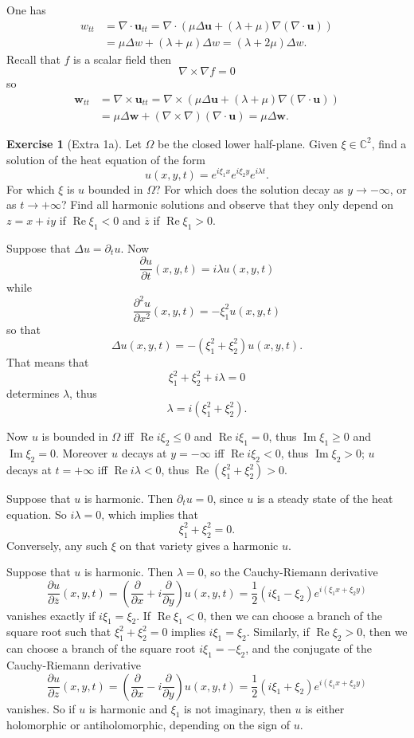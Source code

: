 \documentclass[10pt]{article}
\newcommand{\CC}{\mathbb{C}}
\renewcommand{\Re}{\operatorname{Re}}
\renewcommand{\Im}{\operatorname{Im}}
\theoremstyle{definition}
\newtheorem{exer}{Exercise}
\begin{document}
One has
\begin{align*}
w_{tt} &= \nabla \cdot \mathbf u_{tt} = \nabla \cdot(\mu \Delta \mathbf u + (\lambda + \mu)\nabla(\nabla \cdot \mathbf u) )\\
&= \mu\Delta w + (\lambda + \mu)\Delta w = (\lambda + 2\mu)\Delta w.
\end{align*}
Recall that $f$ is a scalar field then
$$\nabla \times \nabla f = 0$$
so
\begin{align*}
\mathbf w_{tt} &= \nabla \times \mathbf u_{tt} = \nabla \times (\mu\Delta \mathbf u + (\lambda + \mu)\nabla(\nabla \cdot \mathbf u))\\
&= \mu \Delta \mathbf w + (\nabla \times \nabla)(\nabla \cdot \mathbf u) = \mu \Delta \mathbf w.
\end{align*}

\begin{exer}[Extra 1a]
Let $\Omega$ be the closed lower half-plane. Given $\xi \in \CC^2$, find a solution of the heat equation of the form
$$u(x, y, t) = e^{i\xi_1x}e^{i\xi_2y}e^{i\lambda t}.$$
For which $\xi$ is $u$ bounded in $\Omega$? For which does the solution decay as $y \to -\infty$, or as $t \to +\infty$?
Find all harmonic solutions and observe that they only depend on $z = x + iy$ if $\Re \xi_1 < 0$ and $\overline z $ if $\Re \xi_1 > 0$.
\end{exer}

Suppose that $\Delta u = \partial_t u$. Now
$$\frac{\partial u}{\partial t} (x, y, t) = i\lambda u(x, y, t)$$
while
$$\frac{\partial^2 u}{\partial x^2} (x, y, t) = -\xi_1^2 u(x, y, t)$$
so that
$$\Delta u(x, y, t) = -(\xi_1^2 + \xi_2^2) u(x, y, t).$$
That means that
$$\xi_1^2 + \xi_2^2 + i\lambda = 0$$
determines $\lambda$, thus
$$\lambda = i(\xi_1^2 + \xi_2^2).$$

Now $u$ is bounded in $\Omega$ iff $\Re i\xi_2 \leq 0$ and $\Re i\xi_1 = 0$, thus $\Im \xi_1 \geq 0$ and $\Im \xi_2 = 0$.
Moreover $u$ decays at $y = -\infty$ iff $\Re i\xi_2 < 0$, thus $\Im \xi_2 > 0$; $u$ decays at $t = +\infty$ iff $\Re i\lambda < 0$, thus $\Re(\xi_1^2 + \xi_2^2) > 0$.

Suppose that $u$ is harmonic. Then $\partial_t u = 0$, since $u$ is a steady state of the heat equation.
So $i\lambda = 0$, which implies that
$$\xi_1^2 + \xi_2^2 = 0.$$
Conversely, any such $\xi$ on that variety gives a harmonic $u$.

Suppose that $u$ is harmonic. Then $\lambda = 0$, so the Cauchy-Riemann derivative
$$\frac{\partial u}{\partial \overline z}(x, y, t) = \left(\frac{\partial}{\partial x} + i\frac{\partial}{\partial y}\right)u(x, y, t) = \frac{1}{2}(i\xi_1 - \xi_2)e^{i(\xi_1x + \xi_2y)}$$
vanishes exactly if $i\xi_1 = \xi_2$.
If $\Re \xi_1 < 0$, then we can choose a branch of the square root such that $\xi_1^2 + \xi_2^2 = 0$ implies $i\xi_1 = \xi_2$.
Similarly, if $\Re \xi_2 > 0$, then we can choose a branch of the square root $i\xi_1 = -\xi_2$, and the conjugate of the Cauchy-Riemann derivative
$$\frac{\partial u}{\partial z}(x, y, t) = \left(\frac{\partial}{\partial x} - i\frac{\partial}{\partial y}\right)u(x, y, t) = \frac{1}{2}(i\xi_1 + \xi_2)e^{i(\xi_1x + \xi_2y)}$$
vanishes.
So if $u$ is harmonic and $\xi_1$ is not imaginary, then $u$ is either holomorphic or antiholomorphic, depending on the sign of $u$.
\end{document}
